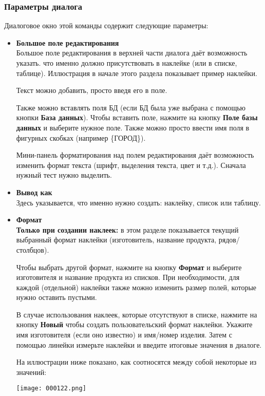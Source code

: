 ﻿\documentclass[a4paper,10pt]{article}
\begin{document}
 \subsubsection{Параметры диалога}
 Диалоговое окно этой команды содержит следующие параметры:
 \begin{itemize}
  \item \textbf{Большое поле редактирования}\\
  Большое поле редактирования в верхней части диалога даёт возможность указать. что именно должно присутствовать в наклейке (или в списке, таблице). Иллюстрация в начале этого раздела показывает пример наклейки.
  
  Текст можно добавить, просто введя его в поле.
  
  Также можно вставлять поля БД (если БД была уже выбрана с помощью кнопки \textbf{База данных}). Чтобы вставить поле, нажмите на кнопку \textbf{Поле базы данных} и выберите нужное поле. Также можно просто ввести имя поля в фигурных скобках (например \{ГОРОД\}).
  
  Мини-панель форматирования над полем редактирования даёт возможность изменить формат текста (шрифт, выделения текста, цвет и т.д.). Сначала нужный тест нужно выделить.
  
  \item \textbf{Вывод как}\\
  Здесь указывается, что именно нужно создать: наклейку, список или таблицу.
  \item \textbf{Формат}\\
  \textbf{Только при создании наклеек:} в этом разделе показывается текущий выбранный формат наклейки (изготовитель, название продукта, рядов/столбцов).
  
  Чтобы выбрать другой формат, нажмите на кнопку \textbf{Формат} и выберите изготовителя и название продукта из списков. При необходимости, для каждой (отдельной) наклейки также можно изменить размер полей, которые нужно оставить пустыми.
  
  В случае использования наклеек, которые отсутствуют в списке, нажмите на кнопку \textbf{Новый} чтобы создать пользовательский формат наклейки. Укажите имя изготовителя (если оно известно) и имя/номер изделия. Затем с помощью линейки измерьте наклейки и введите итоговые значения в диалоге.
  
  На иллюстрации ниже показано, как соотносятся между собой некоторые из значений:
  
  \texttt{[image: 000122.png]}
  

\end{itemize}
\end{document}
